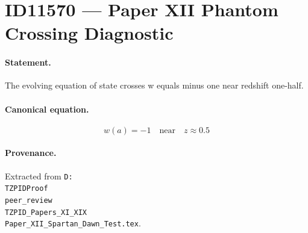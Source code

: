 \section*{ID11570 --- Paper XII Phantom Crossing Diagnostic}

\paragraph{Statement.}
The evolving equation of state crosses w equals minus one near redshift one-half.

\paragraph{Canonical equation.}
\[
w(a)=-1\quad\text{near}\quad z\approx0.5
\]

\paragraph{Provenance.}
Extracted from \texttt{D:\\TZPIDProof\\peer\_review\\TZPID\_Papers\_XI\_XIX\\Paper\_XII\_Spartan\_Dawn\_Test.tex}.
